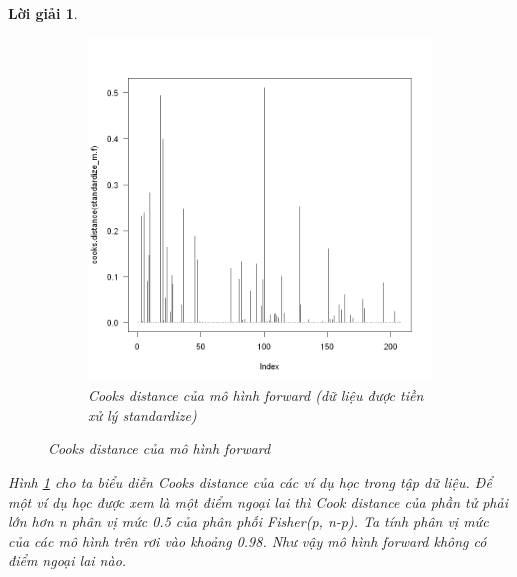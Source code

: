 \documentclass[14pt, a4paper]{article}
\theoremstyle{sltheorem}
\theoremstyle{soltheorem}
\newtheorem*{loigiai}{Lời giải}
\begin{document}
\begin{loigiai}
\begin{figure}[h!]
\begin{subfigure}[b]{0.4\textwidth}
            \includegraphics[width=\textwidth]{figures/standardize_mf_cooks.png}
            \caption{Cooks distance của mô hình forward (dữ liệu được tiền xử lý standardize)}
        \end{subfigure}
        \caption{Cooks distance của mô hình forward}
        \label{fig:Cooks-distance-mf}
    \end{figure}

    Hình \ref{fig:Cooks-distance-mf} cho ta biểu diễn Cooks distance của các ví dụ học trong tập dữ liệu.
    Để một ví dụ học được xem là một điểm ngoại lai thì Cook distance của phần tử phải lớn hơn n phân vị mức 0.5 của phân phối Fisher(p, n-p).
    Ta tính phân vị mức của các mô hình trên rơi vào khoảng 0.98.
    Như vậy mô hình forward không có điểm ngoại lai nào.



\end{loigiai}
\end{document}
